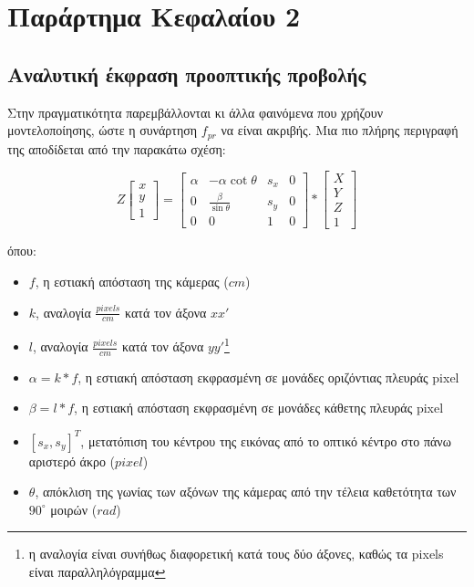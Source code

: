 \g
\chapter{Παράρτημα Κεφαλαίου 2} %

\label{AppendixB} %

\section{Αναλυτική έκφραση προοπτικής προβολής}
\label{appendix:extensive_projection}

Στην πραγματικότητα παρεμβάλλονται κι άλλα φαινόμενα που χρήζουν μοντελοποίησης, ώστε η συνάρτηση $f_{pr}$ να είναι ακριβής. Μια πιο πλήρης περιγραφή της αποδίδεται από την παρακάτω σχέση: \cite{ma2012invitation}

\[ Z\begin{bmatrix}x \\ y \\ 1\end{bmatrix} = 
\begin{bmatrix}
\alpha & -\alpha\cot\theta & s_x & 0\\
0 & \frac{\beta}{\sin\theta} & s_y & 0\\
0 & 0 & 1 & 0 
\end{bmatrix} * 
\begin{bmatrix}
X \\ Y \\ Z \\ 1
\end{bmatrix}  \]

όπου:

\begin{itemize}
	\item $f$, η εστιακή απόσταση της κάμερας ($cm$)
	\item $k$, αναλογία $\frac{pixels}{cm}$ κατά τον άξονα $xx'$
	\item $l$, αναλογία $\frac{pixels}{cm}$ κατά τον άξονα $yy'$\footnote{η αναλογία είναι συνήθως διαφορετική κατά τους δύο άξονες, καθώς τα \e pixels \g είναι παραλληλόγραμμα}
	\item $ \alpha = k*f $, η εστιακή απόσταση εκφρασμένη σε μονάδες οριζόντιας πλευράς \e pixel \g
	\item $ \beta = l*f $, η εστιακή απόσταση εκφρασμένη σε μονάδες κάθετης πλευράς \e pixel \g
	\item $ [s_x,s_y]^T$,  μετατόπιση του κέντρου της εικόνας από το οπτικό κέντρο στο πάνω αριστερό άκρο ($pixel$)
	\item $ \theta $, απόκλιση της γωνίας των αξόνων της κάμερας από την τέλεια καθετότητα των $90^{\circ}$ μοιρών ($rad$)
 \end{itemize}
 
